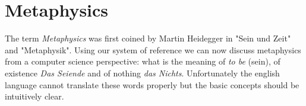 \section{Metaphysics}
The term \textit{Metaphysics} was first coined by Martin Heidegger in "Sein und Zeit" and "Metaphysik". Using our system of reference we can now discuss metaphysics from a computer science perspective: what is the meaning of \textit{to be} (sein), of existence \textit{Das Seiende} and of nothing \textit{das Nichts}. Unfortunately the english language cannot translate these words properly but the basic concepts should be intuitively clear.